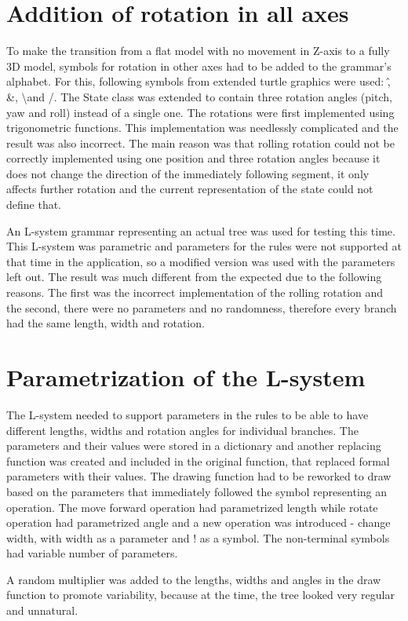 \documentclass[
  digital, %
  table,   %
  nolof,     %
  nolot,     %
]{fithesis3}
\begin{document}
\section{Addition of rotation in all axes}
To make the transition from a flat model with no movement in Z-axis to a fully 3D model, symbols for rotation in other axes had to be added to the grammar's alphabet. For this, following symbols from extended turtle graphics were used: \^ , \&, \textbackslash and /. The State class was extended to contain three rotation angles (pitch, yaw and roll) instead of a single one. The rotations were first implemented using trigonometric functions. This implementation was needlessly complicated and the result was also incorrect. The main reason was that rolling rotation could not be correctly implemented using one position and three rotation angles because it does not change the direction of the immediately following segment, it only affects further rotation and the current representation of the state could not define that.\par
An L-system grammar representing an actual tree was used for testing this time. This L-system was parametric and parameters for the rules were not supported at that time in the application, so a modified version was used with the parameters left out. The result was much different from the expected due to the following reasons. The first was the incorrect implementation of the rolling rotation and the second, there were no parameters and no randomness, therefore every branch had the same length, width and rotation.
\section{Parametrization of the L-system}
The L-system needed to support parameters in the rules to be able to have different lengths, widths and rotation angles for individual branches. The parameters and their values were stored in a dictionary and another replacing function was created and included in the original function, that replaced formal parameters with their values. The drawing function had to be reworked to draw based on the parameters that immediately followed the symbol representing an operation. The move forward operation had parametrized length while rotate operation had parametrized angle and a new operation was introduced - change width, with width as a parameter and ! as a symbol. The non-terminal symbols had variable number of parameters. \par
A random multiplier was added to the lengths, widths and angles in the draw function to promote variability, because at the time, the tree looked very regular and unnatural.
\end{document}
